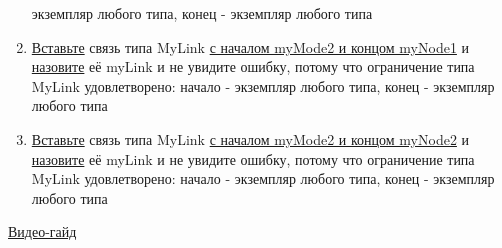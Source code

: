 \begin{enumerate}
            экземпляр
            любого типа, конец - экземпляр любого типа
      \item \hyperlink{DeepCase.InsertLink.Description}{Вставьте} связь типа
            MyLink
            \hyperlink{FAQ.HowToInsertLinkWithFromAndTo}{с началом myMode2 и
                  концом
                  myNode1} и \hyperlink{FAQ.HowToSetName}{назовите} её myLink и
            не
            увидите
            ошибку, потому что ограничение типа MyLink удовлетворено: начало -
            экземпляр
            любого типа, конец - экземпляр любого типа
      \item \hyperlink{DeepCase.InsertLink.Description}{Вставьте} связь типа
            MyLink
            \hyperlink{FAQ.HowToInsertLinkWithFromAndTo}{с началом myMode2 и
                  концом
                  myNode2} и \hyperlink{FAQ.HowToSetName}{назовите} её myLink и
            не
            увидите
            ошибку, потому что ограничение типа MyLink удовлетворено: начало -
            экземпляр
            любого типа, конец - экземпляр любого типа
\end{enumerate}
\href{https://youtu.be/PQObFIfhRMo}{Видео-гайд}
